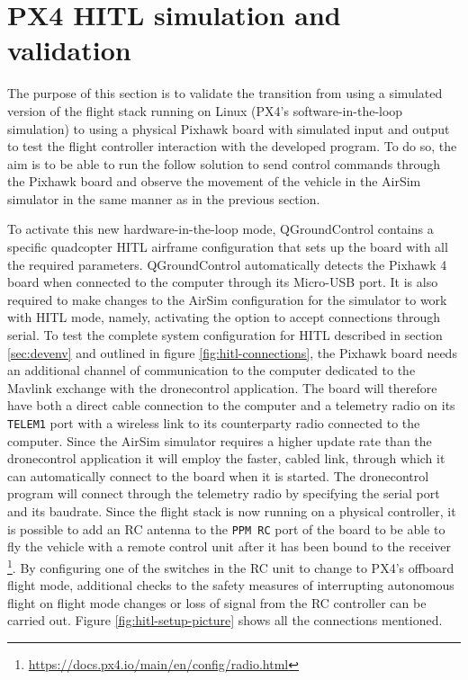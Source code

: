 \section{PX4 HITL simulation and validation}
\label{sec:test-4-hitl}


The purpose of this section is to validate the transition from using a simulated version of the flight stack running on Linux (PX4's software-in-the-loop simulation) to using a physical Pixhawk board with simulated input and output to test the flight controller interaction with the developed program.
To do so, the aim is to be able to run the follow solution to send control commands through the Pixhawk board and observe the movement of the vehicle in the AirSim simulator in the same manner as in the previous section.


To activate this new hardware-in-the-loop mode, QGroundControl contains a specific quadcopter HITL airframe configuration that sets up the board with all the required parameters.
QGroundControl automatically detects the Pixhawk 4 board when connected to the computer through its Micro-USB port.
It is also required to make changes to the AirSim configuration for the simulator to work with HITL mode, namely, activating the option to accept connections through serial.
To test the complete system configuration for HITL described in section \ref{sec:devenv} and outlined in figure \ref{fig:hitl-connections}, the Pixhawk board needs an additional channel of communication to the computer dedicated to the Mavlink exchange with the dronecontrol application.
The board will therefore have both a direct cable connection to the computer and a telemetry radio on its \texttt{TELEM1} port with a wireless link to its counterparty radio connected to the computer.
Since the AirSim simulator requires a higher update rate than the dronecontrol application it will employ the faster, cabled link, through which it can automatically connect to the board when it is started.
The dronecontrol program will connect through the telemetry radio by specifying the serial port and its baudrate.
Since the flight stack is now running on a physical controller, it is possible to add an RC antenna to the \texttt{PPM RC} port of the board to be able to fly the vehicle with a remote control unit after it has been bound to the receiver \footnote{\url{https://docs.px4.io/main/en/config/radio.html}}.
By configuring one of the switches in the RC unit to change to PX4's offboard flight mode, additional checks to the safety measures of interrupting autonomous flight on flight mode changes or loss of signal from the RC controller can be carried out.
Figure \ref{fig:hitl-setup-picture} shows all the connections mentioned.

